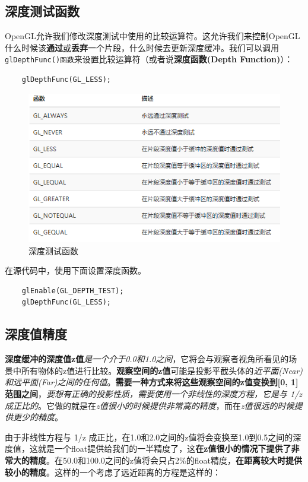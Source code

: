 \documentclass[UTF8,a4paper,12pt]{ctexbook}
\begin{document}
		
		\subsection{深度测试函数}
			OpenGL允许我们修改深度测试中使用的比较运算符。这允许我们来控制OpenGL什么时候该\textbf{通过}\underline{或}\textbf{丢弃}一个片段，什么时候去更新深度缓冲。我们可以调用\verb|glDepthFunc()函数|来设置比较运算符（或者说\textbf{深度函数(Depth Function)}）：
			\begin{lstlisting}
	glDepthFunc(GL_LESS);			
			\end{lstlisting}
			
			\begin{figure}[H]
				\centering
				\includegraphics[width=.95\linewidth]{depthTestFunc}
				\caption{深度测试函数}
			\end{figure}
			
			
			在源代码中，使用下面设置深度函数。
			\begin{lstlisting}
	glEnable(GL_DEPTH_TEST);
	glDepthFunc(GL_LESS);			
			\end{lstlisting}
			
		\subsection{深度值精度}
			\textbf{深度缓冲的深度值z值}\textit{是一个介于0.0和1.0之间}，它将会与观察者视角所看见的场景中所有物体的z值进行比较。\textbf{观察空间的z值}可能是投影平截头体的\textit{近平面(Near)和远平面(Far)之间的任何值}。\textbf{需要一种方式来将这些观察空间的z值变换到[0, 1]范围之间}，\textit{要想有正确的投影性质，需要使用一个非线性的深度方程，它是与 1/z 成正比的}。它做的就是在\textit{z值很小的时候提供非常高的精度}，而在\textit{z值很远的时候提供更少的精度}。
			
			由于非线性方程与 1/z 成正比，在1.0和2.0之间的z值将会变换至1.0到0.5之间的深度值，这就是一个float提供给我们的一半精度了，这\textbf{在z值很小的情况下提供了非常大的精度}。在50.0和100.0之间的z值将会只占2\%的float精度，\textbf{在距离较大时提供较小的精度}。这样的一个考虑了远近距离的方程是这样的：
			
\end{document}
